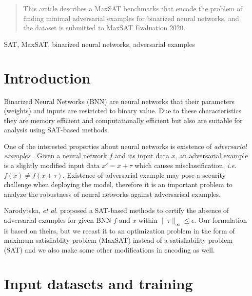 \documentclass[conference]{IEEEtran}
\begin{document}
\begin{abstract}
This article describes a MaxSAT benchmarks that encode the problem of finding minimal adversarial examples for binarized neural networks, and the dataset is submitted to MaxSAT Evaluation 2020.
\end{abstract}

\begin{IEEEkeywords}
SAT, MaxSAT, binarized neural networks, adversarial examples
\end{IEEEkeywords}

\section{Introduction}

Binarized Neural Networks (BNN) \cite{bnn} are neural networks that their parameters (weights) and inputs are restricted to binary value. Due to these characteristics they are memory efficient and computationally efficient but also are suitable for analysis using SAT-based methods.

One of the interested properties about neural networks is existence of \textit{adversarial examples} \cite{adversarial-examples,adversarial-examples-2}.
Given a neural network $f$ and its input data $x$, an adversarial example is a slightly modified input data $x' = x + \tau$ which causes misclassification, \textit{i.e.} $f(x) \neq f(x + \tau)$.
Existence of adversarial example may pose a security challenge when deploying the model, therefore it is an important problem to analyze the robustness of neural networks against adversarisal examples.

Narodytska, \textit{et al.} \cite{bnnverif} proposed a SAT-based methods to certify the absence of adversarial examples for given BNN $f$ and $x$ within $\|\tau\|_{\infty} \le \epsilon$.
Our formulation is based on theirs, but we recast it to an optimization problem in the form of maximum satisfiablity problem (MaxSAT) instead of a satisfiability problem (SAT) and we also make some other modifications in encoding as well.

\section{Input datasets and training}
\end{document}
